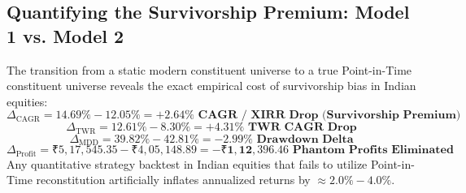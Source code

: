 \documentclass[11pt,a4paper]{article}
\begin{document}
\subsection{Quantifying the Survivorship Premium: Model 1 vs. Model 2}
The transition from a static modern constituent universe to a true Point-in-Time constituent universe reveals the exact empirical cost of survivorship bias in Indian equities:
\begin{equation}
\Delta_{\text{CAGR}} = 14.69\% - 12.05\% = \mathbf{+2.64\% \text{ CAGR / XIRR Drop (Survivorship Premium)}}
\end{equation}
\begin{equation}
\Delta_{\text{TWR}} = 12.61\% - 8.30\% = \mathbf{+4.31\% \text{ TWR CAGR Drop}}
\end{equation}
\begin{equation}
\Delta_{\text{MDD}} = 39.82\% - 42.81\% = \mathbf{-2.99\% \text{ Drawdown Delta}}
\end{equation}
\begin{equation}
\Delta_{\text{Profit}} = ₹5,17,545.35 - ₹4,05,148.89 = -\mathbf{₹1,12,396.46 \text{ Phantom Profits Eliminated}}
\end{equation}
Any quantitative strategy backtest in Indian equities that fails to utilize Point-in-Time reconstitution artificially inflates annualized returns by $\approx 2.0\% - 4.0\%$.
\end{document}
